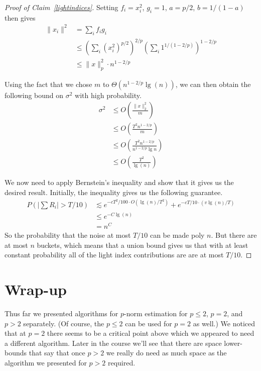 \documentclass[11pt]{article}
\begin{document}
\begin{proof}[Proof of Claim~\ref{lightindices}]
Setting $f_i = x_i^2$, $g_i = 1$, $a = p/2$, $b = 1/(1-a)$ then gives
\begin{align*}
\|x_i\|^2 &= \sum_i f_i g_i \\
	&\leq \left(\sum_i {(x_i^2)}^{p/2} \right)^{2/p} \left(\sum_i 1^{1/(1-2/p)} \right)^{1-2/p} \tag*{(H\"older)} \\
	&\leq \|x\|_p^2 \cdot n^{1-2/p}
\end{align*}

Using the fact that we chose $m$ to $\Theta(n^{1-2/p} \lg(n))$, we can then obtain the following bound on $\sigma^2$ with high probability.
\begin{align*}
\sigma^2 &\leq O \left( \frac{\|x\|_2^2}{m} \right) \\
	&\leq O\left(\frac{T^2 n^{1-2/p}}{m} \right) \tag*{(H\"older trick)}\\
	&\leq O\left( \frac{T^2 n^{1-2/p}}{n^{1-2/p} \lg{n}} \right) \tag*{(choice of $m$)} \\
	&\leq O\left( \frac{T^2}{\lg(n)} \right)
\end{align*}

We now need to apply Bernstein's inequality and show that it gives us the desired result. Initially, the inequality gives us the following guarantee.
\begin{align*}
P\left( \left| \sum R_i \right| > T/10 \right) &\lesssim e^{-cT^2/100 \cdot O( \lg(n) / T^2)} + e^{-cT/10 \cdot (v \lg(n) / T)} \\
	&\leq e^{-C\lg(n)}	\tag*{(for some new constant $C$)} \\
	&= n^C
\end{align*}
So the probability that the noise at most $T/10$ can be made poly $n$. But there are at most $n$ buckets, which means that a union bound gives us that with at least constant probability all of the light index contributions are are at most $T/10$.
\end{proof}

\section{Wrap-up}
Thus far we presented algorithms for $p$-norm estimation for $p \leq 2$, $p = 2$, and $p > 2$ separately. (Of course, the $p \leq 2$ can be used for $p=2$ as well.) We noticed that at $p = 2$ there seems to be a critical point above which we appeared to need a different algorithm. Later in the course we'll see that there are space lower-bounds that say that once $p > 2$ we really do need as much space as the algorithm we presented for $p >2$ required.
\end{document}

